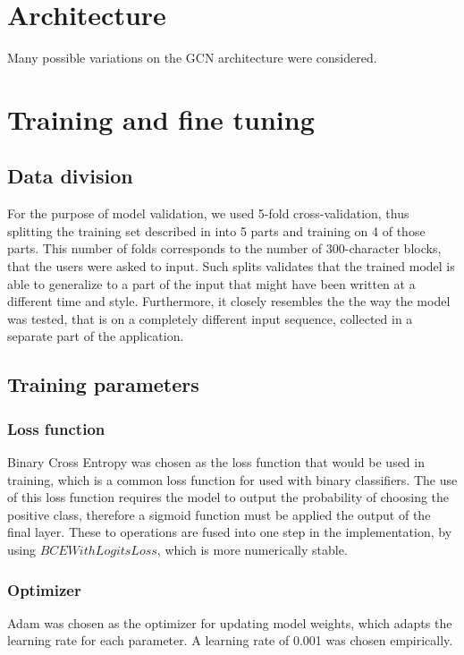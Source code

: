 \section{Architecture}
Many possible variations on the GCN architecture were considered. 

\section{Training and fine tuning}

\subsection{Data division}
For the purpose of model validation, we used 5-fold cross-validation, thus splitting the training set described in  into 5 parts and training on 4 of those parts. This number of folds corresponds to the number of 300-character blocks, that the users were asked to input. Such splits validates that the trained model is able to generalize to a part of the input that might have been written at a different time and style. Furthermore, it closely resembles the the way the model was tested, that is on a completely different input sequence, collected in a separate part of the application.  

\subsection{Training parameters}

\subsubsection{Loss function}
Binary Cross Entropy was chosen as the loss function that would be used in training, which is a common loss function for used with binary classifiers. 
The use of this loss function requires the model to output the probability of choosing the positive class, therefore a sigmoid function must be applied the output of the final layer.
These to operations are fused into one step in the implementation, by using  $BCEWithLogitsLoss$, which is more numerically stable.

\subsubsection{Optimizer}
Adam was chosen as the optimizer for updating model weights, which adapts the learning rate for each parameter. A learning rate of 0.001 was chosen empirically.


